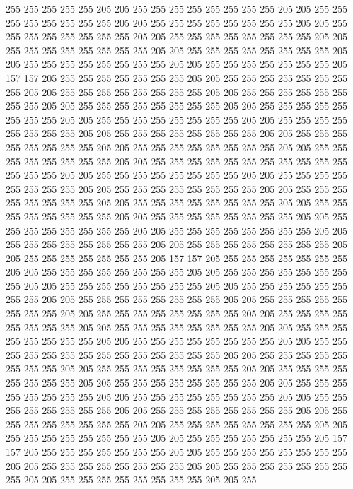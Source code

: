 255 255 255 255 255 205 205 255 255 255 255 255 255 255 255 205 205 255 255 255
255 255 255 255 255 205 205 255 255 255 255 255 255 255 255 205 205 255 255 255
255 255 255 255 255 205 205 255 255 255 255 255 255 255 255 205 205 255 255 255
255 255 255 255 255 205 205 255 255 255 255 255 255 255 255 205 205 255 255 255
255 255 255 255 255 205 205 255 255 255 255 255 255 255 205 157 157 205 255 255
255 255 255 255 255 205 205 255 255 255 255 255 255 255 255 205 205 255 255 255
255 255 255 255 255 205 205 255 255 255 255 255 255 255 255 205 205 255 255 255
255 255 255 255 255 205 205 255 255 255 255 255 255 255 255 205 205 255 255 255
255 255 255 255 255 205 205 255 255 255 255 255 255 255 255 205 205 255 255 255
255 255 255 255 255 205 205 255 255 255 255 255 255 255 255 205 205 255 255 255
255 255 255 255 255 205 205 255 255 255 255 255 255 255 255 205 205 255 255 255
255 255 255 255 255 255 255 255 255 255 255 205 205 255 255 255 255 255 255 255
255 205 205 255 255 255 255 255 255 255 255 205 205 255 255 255 255 255 255 255
255 205 205 255 255 255 255 255 255 255 255 205 205 255 255 255 255 255 255 255
255 205 205 255 255 255 255 255 255 255 255 205 205 255 255 255 255 255 255 255
255 205 205 255 255 255 255 255 255 255 255 205 205 255 255 255 255 255 255 255
255 205 205 255 255 255 255 255 255 255 255 205 205 255 255 255 255 255 255 255
255 205 205 255 255 255 255 255 255 255 205 157 157 205 255 255 255 255 255 255
255 205 205 255 255 255 255 255 255 255 255 205 205 255 255 255 255 255 255 255
255 205 205 255 255 255 255 255 255 255 255 205 205 255 255 255 255 255 255 255
255 205 205 255 255 255 255 255 255 255 255 205 205 255 255 255 255 255 255 255
255 205 205 255 255 255 255 255 255 255 255 205 205 255 255 255 255 255 255 255
255 205 205 255 255 255 255 255 255 255 255 205 205 255 255 255 255 255 255 255
255 205 205 255 255 255 255 255 255 255 255 205 205 255 255 255 255 255 255 255
255 255 255 255 255 255 255 205 205 255 255 255 255 255 255 255 255 205 205 255
255 255 255 255 255 255 255 205 205 255 255 255 255 255 255 255 255 205 205 255
255 255 255 255 255 255 255 205 205 255 255 255 255 255 255 255 255 205 205 255
255 255 255 255 255 255 255 205 205 255 255 255 255 255 255 255 255 205 205 255
255 255 255 255 255 255 255 205 205 255 255 255 255 255 255 255 255 205 205 255
255 255 255 255 255 255 255 205 205 255 255 255 255 255 255 255 255 205 205 255
255 255 255 255 255 255 205 157 157 205 255 255 255 255 255 255 255 205 205 255
255 255 255 255 255 255 255 205 205 255 255 255 255 255 255 255 255 205 205 255
255 255 255 255 255 255 255 205 205 255 255 255 255 255 255 255 255 205 205 255
